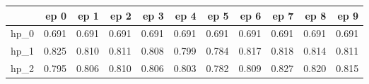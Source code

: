 \begin{tabular}{lrrrrrrrrrr}
\toprule
{} &   ep 0 &   ep 1 &   ep 2 &   ep 3 &   ep 4 &   ep 5 &   ep 6 &   ep 7 &   ep 8 &   ep 9 \\
\midrule
hp\_0 &  0.691 &  0.691 &  0.691 &  0.691 &  0.691 &  0.691 &  0.691 &  0.691 &  0.691 &  0.691 \\
hp\_1 &  0.825 &  0.810 &  0.811 &  0.808 &  0.799 &  0.784 &  0.817 &  0.818 &  0.814 &  0.811 \\
hp\_2 &  0.795 &  0.806 &  0.810 &  0.806 &  0.803 &  0.782 &  0.809 &  0.827 &  0.820 &  0.815 \\
\bottomrule
\end{tabular}
